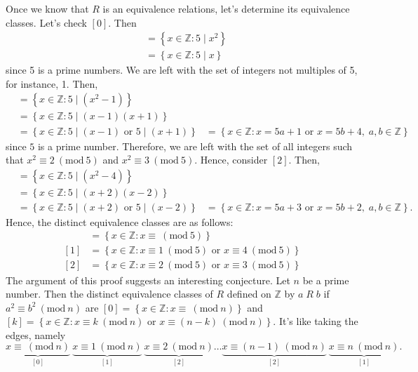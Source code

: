 \documentclass[12pt]{article}
\newcommand{\Z}{\mathbb{Z}}
\newcommand{\Mod}[1]{\ (\mathrm{mod}\ #1)}
\newenvironment{problem}[2][Problem]{\begin{trivlist} \item[\hskip \labelsep {\bfseries #1}\hskip \labelsep {\bfseries #2.}]}{\end{trivlist}}
\newenvironment{solution}[2][Solution]{\begin{trivlist} \item[\hskip \labelsep {\bfseries #1}\hskip \labelsep {\bfseries #2.}]}{\end{trivlist}}
\begin{document}
\begin{problem}{52}
\begin{solution}{52}
    Once we know that $R$ is an equivalence relations, let's determine its equivalence classes. Let's check $[0]$. Then
    \begin{align*}
      [0] &= \left\{x\in\Z:5\mid x^{2} \right\}\\
      &= \left\{x\in\Z:5\mid x\right\}
    \end{align*}
    since 5 is a prime numbers.
    We are left with the set of integers not multiples of 5, for instance, 1. Then,
    \begin{align*}
      [1] &= \left\{x\in\Z:5\mid(x^{2}-1)\right\}\\
      &= \left\{x\in\Z:5\mid(x-1)(x+1)\right\}\\
      &= \left\{x\in\Z:5\mid(x-1)\text{ or }5\mid(x+1)\right\}
      &= \left\{x\in\Z:x=5a+1\text{ or }x=5b+4,\; a,b\in\Z\right\}
    \end{align*}
    since $5$ is a prime number. Therefore, we are left with the set of all integers such that $x^{2} \equiv 2 \Mod5$ and $x^{2} \equiv 3\Mod 5$. Hence, consider $[2]$. Then,
    \begin{align*}
      [2] &= \left\{x\in\Z:5\mid(x^{2}-4)\right\}\\
      &= \left\{x\in\Z:5\mid(x+2)(x-2)\right\}\\
      &= \left\{x\in\Z:5\mid(x+2)\text{ or }5\mid(x-2)\right\}
      &= \left\{x\in\Z:x=5a+3\text{ or }x=5b+2,\; a,b\in\Z\right\}.
    \end{align*}
    Hence, the distinct equivalence classes are as follows:
    \begin{align*}
      [0] &= \left\{x\in\Z:x\equiv \Mod 5\right\}\\
      [1] &= \left\{x\in\Z:x\equiv 1 \Mod 5 \text{ or } x\equiv 4\Mod 5\right\}\\    
      [2] &= \left\{x\in\Z:x\equiv 2 \Mod 5 \text{ or } x\equiv 3\Mod 5\right\}
    \end{align*}
    The argument of this proof suggests an interesting conjecture. Let $n$ be a prime number. Then the distinct equivalence classes of $R$ defined on $\Z$ by $a\; R\; b$ if $a^{2} \equiv b^{2} \Mod n$ are $[0] = \left\{ x\in\Z: x\equiv \Mod n\right\}$ and $[k] = \left\{ x\in\Z: x\equiv k \Mod n \text{ or } x\equiv (n-k) \Mod n\right\}$. It's like taking the edges, namely
    \begin{equation*}
      \underbrace{x\equiv \Mod n}_{[0]} \:
      \underbrace{x\equiv 1 \Mod n}_{[1]}  \: \underbrace{x\equiv 2 \Mod n}_{[2]} \dots  \underbrace{x\equiv (n-1) \Mod n}_{[2]} \: \underbrace{x\equiv n \Mod n}_{[1]}. 
    \end{equation*}


\end{solution}
\end{problem}
\end{document}
